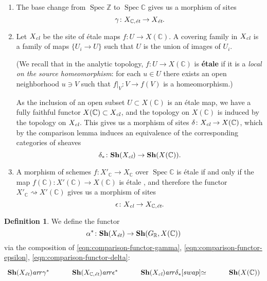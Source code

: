 \documentclass[leqno,12pt]{article}
\theoremstyle{plain}
\theoremstyle{definition}
\newtheorem{definition}[theorem]{\indent\sc Definition}
\DeclareMathOperator{\Spec}{Spec}
\newcommand{\CC}{\mathbb{C}}
\newcommand{\RR}{\mathbb{R}}
\newcommand{\ZZ}{\mathbb{Z}}
\newcommand{\ar}{\text{\it ar}}
\newcommand{\et}{\text{\it \'{e}t}}
\begin{document}
\begin{enumerate}
\item The base change from $\Spec \ZZ$ to $\Spec \CC$ gives us a morphism of
  sites
  \begin{equation}
    \label{eqn:comparison-functor-gamma}
    \gamma\colon X_{\CC,\text{\it \'{e}t}} \to X_\et.
  \end{equation}

\item Let $X_\text{\it cl}$ be the site of \'{e}tale maps
  $f\colon U\to X (\CC)$. A covering family in $X_\text{\it cl}$ is a family of
  maps $\{ U_i \to U \}$ such that $U$ is the union of images of $U_i$.

  (We recall that in the analytic topology, $f\colon U\to X (\CC)$ is \textbf{\'{e}tale}
  if it is a \emph{local on the source homeomorphism}: for each $u \in U$ there
  exists an open neighborhood $u \ni V$ such that
  $\left.f\right|_V\colon V\to f(V)$ is a homeomorphism.)

  As the inclusion of an open subset $U \subset X (\CC)$ is an \'{e}tale map,
  we have a fully faithful functor $X (\CC) \subset X_\text{\it cl}$, and the
  topology on $X (\CC)$ is induced by the topology on $X_\text{\it cl}$. This
  gives us a morphism of sites $\delta\colon X_\text{\it cl} \to X (\CC)$, which
  by the comparison lemma \cite[Expos\'{e}~III, Th\'{e}or\`{e}me~4.1]{SGA4}
  induces an equivalence of the corresponding categories of sheaves
  \begin{equation}
    \label{eqn:comparison-functor-delta}
    \delta_*\colon \mathbf{Sh} (X_\text{\it cl}) \to \mathbf{Sh} (X (\CC)).
  \end{equation}

\item A morphism of schemes $f\colon X'_\CC \to X_\CC$ over $\Spec \CC$ is
  \'{e}tale if and only if the map $f (\CC)\colon X' (\CC) \to X (\CC)$ is
  \'{e}tale \cite[Expos\'{e}~XII, Proposition~3.1]{SGA1}, and therefore the
  functor $X'_\CC \rightsquigarrow X' (\CC)$ gives us a morphism of sites
  \begin{equation}
    \label{eqn:comparison-functor-epsilon}
    \epsilon\colon X_\text{\it cl} \to X_{\CC,\text{\it \'{e}t}}.
  \end{equation}
\end{enumerate}

\begin{definition}
  We define the functor
  $$\alpha^*\colon \mathbf{Sh} (X_\et) \to \mathbf{Sh} (G_\RR, X (\CC))$$
  via the composition of \eqref{eqn:comparison-functor-gamma},
  \eqref{eqn:comparison-functor-epsilon}, \eqref{eqn:comparison-functor-delta}:
  \[ \begin{tikzcd}
      \mathbf{Sh} (X_\et) \ar{r}{\gamma^*} &
      \mathbf{Sh} (X_{\CC,\text{\it \'{e}t}}) \ar{r}{\epsilon^*} &
      \mathbf{Sh} (X_\text{\it cl}) \ar{r}{\delta_*}[swap]{\simeq} &
      \mathbf{Sh} (X (\CC))
    \end{tikzcd} \]
\end{definition}
\end{document}
